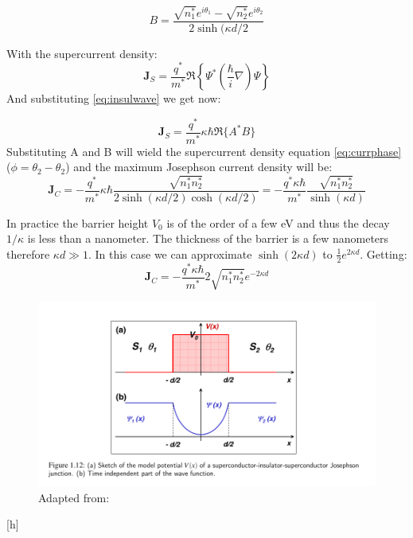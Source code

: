 \documentclass[12pt]{article}
\numberwithin{equation}{subsection}
\begin{document}
\begin{equation}
    B = \frac{ \sqrt{n^*_1} e^{i\theta_1}- \sqrt{n^*_2} e^{i\theta_2}}{2\sinh(\kappa d/2}
\end{equation}

With the supercurrent density:
\begin{equation}
    \mathbf J_S = \frac{q^*}{m^*} \mathfrak R \left \{ \Psi^*\left (\frac{\hbar}{i} \nabla    \right)\Psi \right \}
\end{equation}
And substituting \ref{eq:insulwave} we get now:

\begin{equation}
    \mathbf J_S = \frac{q^*}{m^*}\kappa \hbar  \mathfrak R \{ A^*B\}
\end{equation}
Substituting A and B will wield the supercurrent density equation \ref{eq:currphase} ($\phi=\theta_2-\theta_2$) and the maximum Josephson current density will be:
\begin{equation}
    \mathbf J_C =  -\frac{q^*}{m^*}\kappa \hbar \frac {\sqrt {n_1^*n_2^*}}{2\sinh(\kappa d/2) \cosh(\kappa d/2)} = -\frac{q^*\kappa \hbar}{m^*} \frac {\sqrt {n_1^*n_2^*}}{\sinh(\kappa d)}
\end{equation}

In practice the barrier height $V_0$ is of the order of a few eV and thus the decay $1/\kappa$ is less than a nanometer. The thickness of the barrier is a few nanometers therefore $\kappa d \gg 1$. In this case we can approximate $\sinh(2\kappa d)$ to $\frac{1}{2} e^{2\kappa d}$. Getting:
\begin{equation}
    \mathbf J_C = -\frac{q^*\kappa \hbar}{m^*} 2\sqrt {n_1^*n_2^*} e^{-2\kappa d}
\end{equation}

\begin{figure}[h]
\includegraphics[scale=1.6]{images/potential-wavefunc.png}
\caption{Adapted from: \cite{gross2016applied}}
\end{figure}[h]
\end{document}
